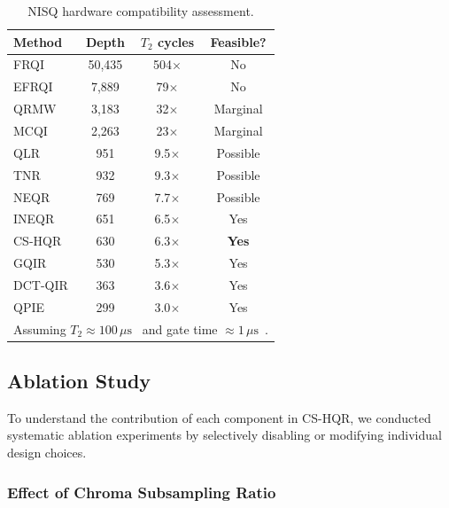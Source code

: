 \documentclass{ipol}
\newcommand{\cshqr}{\textsc{CS-HQR}}
\newcommand{\frqi}{\textsc{FRQI}}
\newcommand{\neqr}{\textsc{NEQR}}
\newcommand{\mcqi}{\textsc{MCQI}}
\begin{document}
\begin{table}[H]
\begin{center}
\begin{tabular}{lccc}
\hline
Method & Depth & $T_2$ cycles & Feasible? \\
\hline
\frqi   & 50,435 & 504$\times$ & No \\
EFRQI   & 7,889  & 79$\times$  & No \\
QRMW    & 3,183  & 32$\times$  & Marginal \\
\mcqi   & 2,263  & 23$\times$  & Marginal \\
QLR     & 951    & 9.5$\times$ & Possible \\
TNR     & 932    & 9.3$\times$ & Possible \\
\neqr   & 769    & 7.7$\times$ & Possible \\
INEQR   & 651    & 6.5$\times$ & Yes \\
\rowcolor{green!15}
\cshqr  & 630    & 6.3$\times$ & \textbf{Yes} \\
GQIR    & 530    & 5.3$\times$ & Yes \\
DCT-QIR & 363    & 3.6$\times$ & Yes \\
QPIE    & 299    & 3.0$\times$ & Yes \\
\hline
\multicolumn{4}{l}{\footnotesize Assuming $T_2 \approx 100\,\mu\text{s}$~\cite{ref38}
  and gate time $\approx 1\,\mu\text{s}$~\cite{ref27}.}
\end{tabular}
\caption{NISQ hardware compatibility assessment.}
\label{tab:nisq_feasibility}
\end{center}
\end{table}

\FloatBarrier
\subsection{Ablation Study}

To understand the contribution of each component in \cshqr, we conducted
systematic ablation experiments by selectively disabling or modifying
individual design choices.

\FloatBarrier
\subsubsection{Effect of Chroma Subsampling Ratio}
\end{document}
